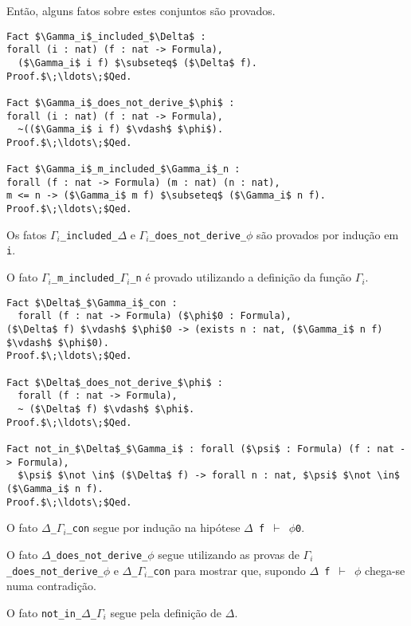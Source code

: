         Então, alguns fatos sobre estes conjuntos são provados.

        \begin{lstlisting}[name=Completeness, frame=single, language=coq]
Fact $\Gamma_i$_included_$\Delta$ : 
forall (i : nat) (f : nat -> Formula),
  ($\Gamma_i$ i f) $\subseteq$ ($\Delta$ f).
Proof.$\;\ldots\;$Qed.

Fact $\Gamma_i$_does_not_derive_$\phi$ :
forall (i : nat) (f : nat -> Formula),
  ~(($\Gamma_i$ i f) $\vdash$ $\phi$).
Proof.$\;\ldots\;$Qed.

Fact $\Gamma_i$_m_included_$\Gamma_i$_n : 
forall (f : nat -> Formula) (m : nat) (n : nat), 
m <= n -> ($\Gamma_i$ m f) $\subseteq$ ($\Gamma_i$ n f).
Proof.$\;\ldots\;$Qed.
        \end{lstlisting}

        Os fatos \texttt{$\Gamma_i$\_included\_$\Delta$} e \texttt{$\Gamma_i$\_does\_not\_derive\_$\phi$} são provados por indução em \texttt{i}. 
        
        O fato \texttt{$\Gamma_i$\_m\_included\_$\Gamma_i$\_n} é provado utilizando a definição da função \texttt{$\Gamma_i$}.

        \begin{lstlisting}[name=Completeness, frame=single, language=coq]
Fact $\Delta$_$\Gamma_i$_con :
  forall (f : nat -> Formula) ($\phi$0 : Formula), 
($\Delta$ f) $\vdash$ $\phi$0 -> (exists n : nat, ($\Gamma_i$ n f) $\vdash$ $\phi$0).
Proof.$\;\ldots\;$Qed.

Fact $\Delta$_does_not_derive_$\phi$ : 
  forall (f : nat -> Formula), 
  ~ ($\Delta$ f) $\vdash$ $\phi$.
Proof.$\;\ldots\;$Qed.

Fact not_in_$\Delta$_$\Gamma_i$ : forall ($\psi$ : Formula) (f : nat -> Formula),
  $\psi$ $\not \in$ ($\Delta$ f) -> forall n : nat, $\psi$ $\not \in$ ($\Gamma_i$ n f).
Proof.$\;\ldots\;$Qed.
        \end{lstlisting}
        
        O fato \texttt{$\Delta$\_$\Gamma_i$\_con} segue por indução na hipótese \texttt{$\Delta$ f $\vdash$ $\phi$0}. 
        
        O fato \texttt{$\Delta$\_does\_not\_derive\_$\phi$} segue utilizando as provas de \texttt{$\Gamma_i$\_does\_not\_derive\_$\phi$} e \texttt{$\Delta$\_$\Gamma_i$\_con} para mostrar que, supondo \texttt{$\Delta$ f $\vdash$ $\phi$} chega-se numa contradição. 
        
        O fato \texttt{not\_in\_$\Delta$\_$\Gamma_i$} segue pela definição de $\Delta$.
        
